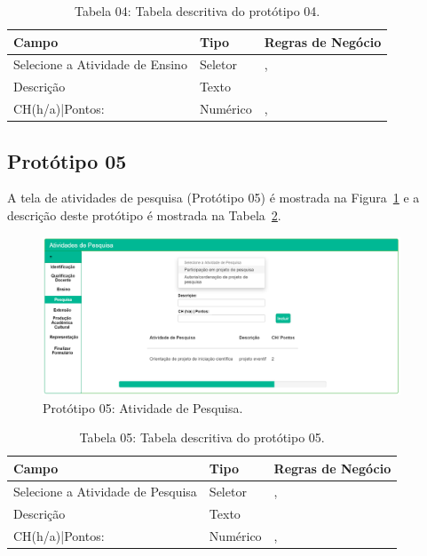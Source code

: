 \begin{table}[H]
\centering
\caption[Tabela 04: Tabela descritiva do protótipo 04.]{Tabela 04: Tabela descritiva do protótipo 04.}
\label{tab:prot04}
\begin{tabular}{@{}lll@{}}
\toprule
Campo                           & Tipo     &  Regras de Negócio             \\ \midrule
Selecione a Atividade de Ensino & Seletor  &    \nameref{rn007}, \nameref{rn019}     \\
Descrição                       & Texto    &    \nameref{rn007}                 \\
CH(h/a)|Pontos:                 & Numérico &    \nameref{rn007}, \nameref{rn020}     \\ \bottomrule
\end{tabular}
\end{table}

\newpage
\subsection{Protótipo 05}\label{prototipo05}
A tela de atividades de pesquisa (Protótipo 05) é mostrada na Figura~\ref{fig:prot05} e a descrição deste protótipo é mostrada na Tabela~\ref{tab:prot05}.


\begin{figure}[H]
    \centering
    \includegraphics[width=0.95\textwidth]{img/5pagina_pesquisa.png}
    \caption[Protótipo 05: Atividade de Pesquisa]{Protótipo 05: Atividade de Pesquisa.}
    \label{fig:prot05}
\end{figure}


\begin{table}[H]
\centering
\caption[Tabela 05: Tabela descritiva do protótipo 05.]{Tabela 05: Tabela descritiva do protótipo 05.}
\label{tab:prot05}
\begin{tabular}{@{}lll@{}}
\toprule
Campo                             & Tipo     &  Regras de Negócio     \\ \midrule
Selecione a Atividade de Pesquisa & Seletor  &    \nameref{rn008}, \nameref{rn019}\\
Descrição                         & Texto    &    \nameref{rn008}                 \\
CH(h/a)|Pontos:                   & Numérico &    \nameref{rn008}, \nameref{rn020}\\ \bottomrule
\end{tabular}
\end{table}

